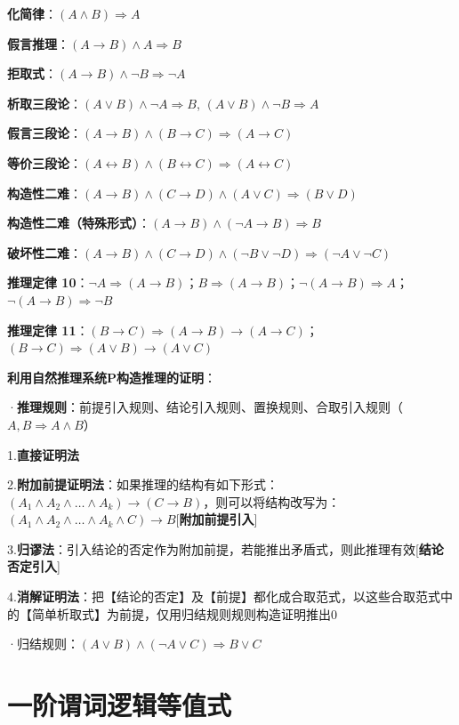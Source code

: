 \textbf{化简律}：$(A \land B) \Rightarrow A$

\textbf{假言推理}：$(A \rightarrow B) \land A \Rightarrow B$

\textbf{拒取式}：$(A \rightarrow B) \land \neg B \Rightarrow \neg A$

\textbf{析取三段论}：$(A \vee B) \land \neg A \Rightarrow B$, $(A \vee B) \land \neg B \Rightarrow A$

\textbf{假言三段论}：$(A \rightarrow B) \land (B \rightarrow C) \Rightarrow (A \rightarrow C)$

\textbf{等价三段论}：$(A \leftrightarrow B) \land (B \leftrightarrow C) \Rightarrow (A \leftrightarrow C)$

\textbf{构造性二难}：$(A \rightarrow B) \land (C \rightarrow D) \land (A \vee C) \Rightarrow (B \vee D)$

\textbf{构造性二难（特殊形式）}：$(A \rightarrow B) \land (\neg A \rightarrow B) \Rightarrow B$

\textbf{破坏性二难}：$(A \rightarrow B) \land (C \rightarrow D) \land (\neg B \vee \neg D) \Rightarrow (\neg A \vee \neg C)$

\textbf{推理定律 10}：$\neg A \Rightarrow (A \rightarrow B)$；$B \Rightarrow (A \rightarrow B)$；$\neg (A \rightarrow B) \Rightarrow A$；$\neg (A \rightarrow B) \Rightarrow \neg B$

\textbf{推理定律 11}：$(B \rightarrow C) \Rightarrow (A \rightarrow B) \rightarrow (A \rightarrow C)$；$(B \rightarrow C) \Rightarrow (A \vee B) \rightarrow (A \vee C)$

\textbf{利用自然推理系统P构造推理的证明}：

·\textbf{推理规则}：前提引入规则、结论引入规则、置换规则、合取引入规则（$A, B \Rightarrow A \land B$）

1.\textbf{直接证明法}

2.\textbf{附加前提证明法}：如果推理的结构有如下形式：$(A_1 \land A_2 \land \ldots \land A_k) \rightarrow (C \rightarrow B)$，则可以将结构改写为：$(A_1 \land A_2 \land \ldots \land A_k \land C) \rightarrow B$[\textbf{附加前提引入}]

3.\textbf{归谬法}：引入结论的否定作为附加前提，若能推出矛盾式，则此推理有效[\textbf{结论否定引入}]

4.\textbf{消解证明法}：把【结论的否定】及【前提】都化成合取范式，以这些合取范式中的【简单析取式】为前提，仅用归结规则规则构造证明推出0

·归结规则：$(A \vee B) \land (\lnot A \vee C) \Rightarrow B \vee C$

\section*{一阶谓词逻辑等值式}

